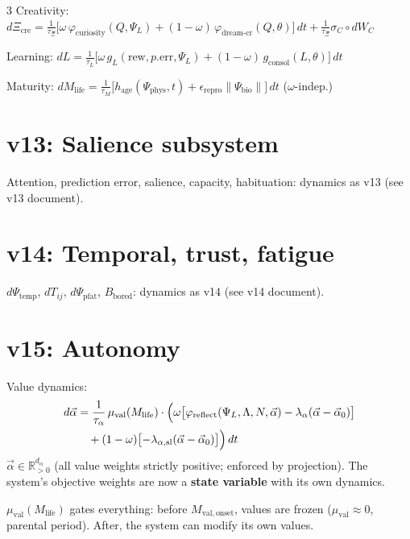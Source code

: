 \documentclass[8pt,landscape]{extarticle}
\newcommand{\vnew}[1]{\textcolor{v13color}{#1}}
\newcommand{\vfour}[1]{\textcolor{v14color}{#1}}
\newcommand{\vfive}[1]{\textcolor{v15color}{#1}}
\begin{document}
\begin{multicols}{3}
Creativity:
$d\Xi_{\mathrm{cre}} = \frac{1}{\tau_\Xi}\bigl[\omega\,\varphi_{\mathrm{curiosity}}(Q, \Psi_L) + (1-\omega)\,\varphi_{\mathrm{dream\text{-}cr}}(Q, \theta)\bigr]\,dt + \frac{1}{\tau_\Xi}\sigma_C \circ dW_C$

Learning:
$dL = \frac{1}{\tau_L}\bigl[\omega\,g_L(\mathrm{rew}, p.\mathrm{err}, \Psi_L) + (1-\omega)\,g_{\mathrm{consol}}(L, \theta)\bigr]\,dt$

Maturity:
$dM_{\mathrm{life}} = \frac{1}{\tau_M}\bigl[h_{\mathrm{age}}(\Psi_{\mathrm{phys}}, t) + \epsilon_{\mathrm{repro}}\|\Psi_{\mathrm{bio}}\|\bigr]\,dt$ \quad ($\omega$-indep.)

\section*{v13: Salience subsystem}

\vnew{Attention, prediction error, salience, capacity, habituation: dynamics as v13 (see v13 document).}

\section*{v14: Temporal, trust, fatigue}

\vfour{$d\Psi_{\mathrm{temp}}$, $dT_{ij}$, $d\Psi_{\mathrm{pfat}}$, $B_{\mathrm{bored}}$: dynamics as v14 (see v14 document).}

\section*{\vfive{v15: Autonomy}}

\vfive{Value dynamics:}
\vfive{
\begin{align*}
d\vec\alpha &= \frac{1}{\tau_\alpha}\,\mu_{\mathrm{val}}(M_{\mathrm{life}}) \cdot \Bigl(\omega \bigl[\varphi_{\mathrm{reflect}}(\Psi_L, \Lambda, N, \vec\alpha) - \lambda_\alpha(\vec\alpha - \vec\alpha_0)\bigr] \\
&\quad + (1-\omega)\bigl[-\lambda_{\alpha,\mathrm{sl}}(\vec\alpha - \vec\alpha_0)\bigr]\Bigr)\,dt
\end{align*}
}
\vfive{$\vec\alpha \in \mathbb{R}^{d_\alpha}_{>0}$ (all value weights strictly positive; enforced by projection). The system's objective weights are now a \textbf{state variable} with its own dynamics.}

\vfive{$\mu_{\mathrm{val}}(M_{\mathrm{life}})$ gates everything: before $M_{\mathrm{val,onset}}$, values are frozen ($\mu_{\mathrm{val}} \approx 0$, parental period). After, the system can modify its own values.}


\end{multicols}
\end{document}
